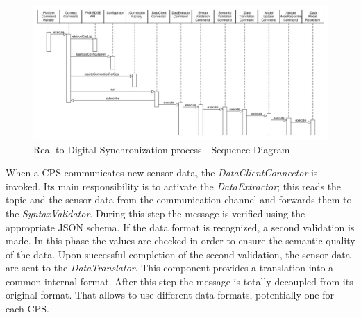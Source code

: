 \begin{figure}
  \includegraphics[width=\textheight]{images/R2DSsequence.png}
  \caption{Real-to-Digital Synchronization process - Sequence Diagram}
  \label{fig:r2dssequence}
\end{figure}


When a CPS communicates new sensor data, the \textit{DataClientConnector} is invoked. Its main responsibility is to activate the \textit{DataExtractor}; this reads the topic and the sensor data from the communication channel and forwards them to the \textit{SyntaxValidator}.
During this step the message is verified using the appropriate JSON schema. If the data format is recognized, a second validation is made. In this phase the values are checked in order to ensure the semantic quality of the data.
Upon successful completion of the second validation, the sensor data are sent to the \textit{DataTranslator}. This component provides a translation into a common internal format. After this step the message is totally decoupled from its original format. That allows to use different data formats, potentially one for each CPS. 



